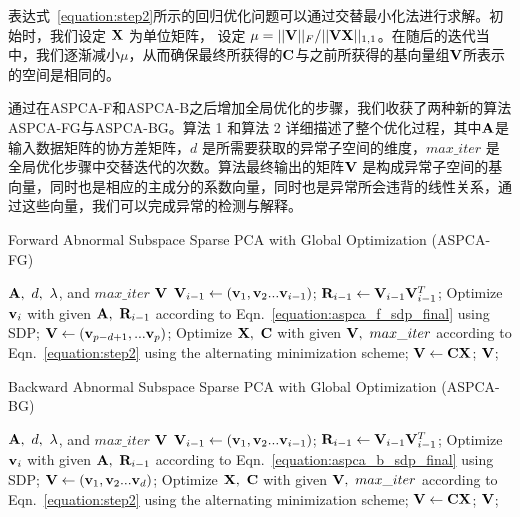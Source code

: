 表达式~\ref{equation:step2}所示的回归优化问题可以通过交替最小化法进行求解\cite{SPCA-2006}。初始时，我们设定 ${\bf X}$ 为单位矩阵， 设定 $\mu = ||{\bf V}||_F/||{\bf V}{\bf X}||_{1,1}$。在随后的迭代当中，我们逐渐减小$\mu$，从而确保最终所获得的${\bf C}$与之前所获得的基向量组${\bf V}$所表示的空间是相同的。

通过在ASPCA-F和ASPCA-B之后增加全局优化的步骤，我们收获了两种新的算法ASPCA-FG与ASPCA-BG。算法 1 和算法 2 详细描述了整个优化过程，其中${\bf A}$是输入数据矩阵的协方差矩阵，$d$ 是所需要获取的异常子空间的维度，$max\_iter$ 是全局优化步骤中交替迭代的次数。算法最终输出的矩阵${\bf V}$ 是构成异常子空间的基向量，同时也是相应的主成分的系数向量，同时也是异常所会违背的线性关系，通过这些向量，我们可以完成异常的检测与解释。

\renewcommand{\algorithmicrequire}{\textbf{Input:}}
\renewcommand{\algorithmicensure}{\textbf{Output:}}
\begin{algorithm}
\begin{algorithmic}[1]
    \caption{Forward Abnormal Subspace Sparse PCA with Global Optimization (ASPCA-FG)}
    \REQUIRE  ${\bf A},\ d,\ \lambda$, and $max\_iter$
    \ENSURE ${\bf V}$
	\STATE ${\bf V}_{i-1} \gets ({\bf v}_1,{\bf v}_2...{\bf v}_{i-1})$;
 	\STATE ${\bf R}_{i-1} \gets {\bf V}_{i-1}{\bf V}_{i-1}^T$;
	\STATE Optimize ${\bf v}_i$ with given ${\bf A},\ {\bf R}_{i-1}$ according to Eqn.~\ref{equation:aspca_f_sdp_final} using SDP;
    \ENDFOR
    \STATE ${\bf V} \gets ({\bf v}_{p-d+1},...{\bf v}_p)$;
    \STATE Optimize ${\bf X},\ {\bf C}$ with given ${\bf V},\ max\_iter$ according to Eqn.~\ref{equation:step2} using the alternating minimization scheme;
    \STATE ${\bf V} \gets {\bf C}{\bf X}$;
    \RETURN ${\bf V}$;
\end{algorithmic}
\end{algorithm}

\renewcommand{\algorithmicrequire}{\textbf{Input:}}
\renewcommand{\algorithmicensure}{\textbf{Output:}}
\begin{algorithm}
\begin{algorithmic}[1]
    \caption{Backward Abnormal Subspace Sparse PCA with Global Optimization (ASPCA-BG)}
    \REQUIRE  ${\bf A},\ d,\ \lambda$, and $max\_iter$
    \ENSURE ${\bf V}$
	\STATE ${\bf V}_{i-1} \gets ({\bf v}_1,{\bf v}_2...{\bf v}_{i-1})$;
 	\STATE ${\bf R}_{i-1} \gets {\bf V}_{i-1}{\bf V}_{i-1}^T$;
	\STATE Optimize ${\bf v}_i$ with given ${\bf A},\ {\bf R}_{i-1}$ according to Eqn.~\ref{equation:aspca_b_sdp_final} using SDP;
    \ENDFOR
    \STATE ${\bf V} \gets ({\bf v}_1,{\bf v}_2...{\bf v}_d)$;
    \STATE Optimize ${\bf X},\ {\bf C}$ with given ${\bf V},\ max\_iter$ according to Eqn.~\ref{equation:step2} using the alternating minimization scheme;
    \STATE ${\bf V} \gets {\bf C}{\bf X}$;
    \RETURN ${\bf V}$;
\end{algorithmic}
\end{algorithm}

